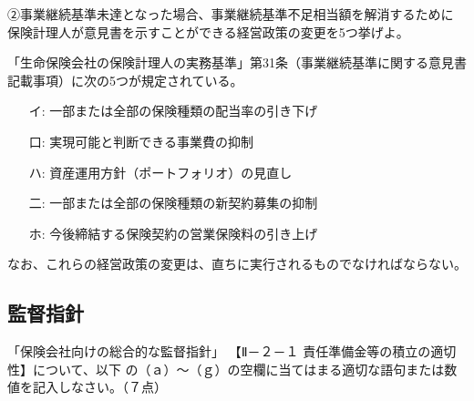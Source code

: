\documentclass[report,gutter=10mm,fore-edge=10mm,uplatex,dvipdfmx]{jlreq}
\begin{document}
②事業継続基準未達となった場合、事業継続基準不足相当額を解消するために
保険計理人が意見書を示すことができる経営政策の変更を5つ挙げよ。

「生命保険会社の保険計理人の実務基準」第31条（事業継続基準に関する意見書記載事項）に次の5つが規定されている。

\begin{itemize}
\item[ イ: ] 一部または全部の保険種類の配当率の引き下げ
\item[ 口: ] 実現可能と判断できる事業費の抑制
\item[ ハ: ] 資産運用方針（ポートフォリオ）の見直し
\item[ 二: ] 一部または全部の保険種類の新契約募集の抑制
\item[ ホ: ] 今後締結する保険契約の営業保険料の引き上げ
\end{itemize}

なお、これらの経営政策の変更は、直ちに実行されるものでなければならない。

\subsection{監督指針}

「保険会社向けの総合的な監督指針」
【Ⅱ－２－１ 責任準備金等の積立の適切性】について、以下
の（ａ）～（ｇ）の空欄に当てはまる適切な語句または数値を記入しなさい。（７点）
\end{document}

